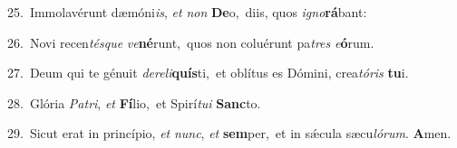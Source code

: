 {\numbfont\textcolor{\numbcolor}{25.}}~Immolavérunt dæmóni\-\textit{is}\-, \textit{et} \textit{non} \textbf{De}\-o,~\star diis, quos \textit{i}\-\textit{gno}\textbf{rá}bant:\par
{\numbfont\textcolor{\numbcolor}{26.}}~Novi recen\-\textit{tés}\-\textit{que} \textit{ve}\-\textbf{né}runt,~\star quos non coluérunt pa\textit{tres} \textit{e}\-\textbf{ó}rum.\par
{\numbfont\textcolor{\numbcolor}{27.}}~Deum qui te génuit \textit{de}\-\textit{re}\textit{li}\textbf{quís}ti,~\star et oblítus es Dómini, crea\-\textit{tó}\-\textit{ris} \textbf{tu}\-i.\par
{\numbfont\textcolor{\numbcolor}{28.}}~Glória \textit{Pa}\-\textit{tri}, \textit{et} \textbf{Fí}\-lio,~\star et Spirí\-\textit{tu}\-\textit{i} \textbf{Sanc}\-to.\par
{\numbfont\textcolor{\numbcolor}{29.}}~Sicut erat in princípio, \textit{et} \textit{nunc}\-, \textit{et} \textbf{sem}\-per,~\star et in sǽcula sæcu\-\textit{ló}\-\textit{rum}. \textbf{A}\-men.\par
